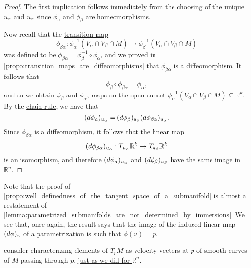 \documentclass[notoc,notitlepage]{tufte-book}
\begin{document}
\begin{proof}
  The first implication follows immediately from the choosing of the unique
  $u_\alpha$ and $u_\alpha$ since $\phi_\alpha$ and $\phi_\beta$ are
  homeomorphisms.

  Now recall that the \hyperref[defn:transition_map]{transition map}
  \begin{equation*}
    \phi_{\beta \alpha} : \phi_{\alpha}^{-1} (V_\alpha \cap V_\beta \cap M) \to
    \phi_{\beta}^{-1} (V_\alpha \cap V_\beta \cap M)
  \end{equation*}
  was defined to be $\phi_{\beta \alpha} = \phi_{\beta}^{-1} \circ
  \phi_{\alpha}$, and we proved in
  \cref{propo:transition_maps_are_diffeomorphisms} that $\phi_{\beta \alpha}$ is
  a \hyperref[defn:diffeomorphism]{diffeomorphism}. It follows that
  \begin{equation*}
    \phi_{\beta} \circ \phi_{\beta \alpha} = \phi_{\alpha},
  \end{equation*}
  and so we obtain $\phi_\beta$ and $\phi_\alpha$, maps on the open subset
  $\phi_{\alpha}^{-1} (V_\alpha \cap V_\beta \cap M) \subseteq \mathbb{R}^k$. By
  the \hyperref[thm:the_chain_rule]{chain rule}, we have that
  \begin{equation*}
    (\mathop{}\!d{\phi_\alpha})_{u_\alpha} = (\mathop{}\!d{\phi_\beta})_{u_\beta}
    (\mathop{}\!d{\phi_{\beta \alpha}})_{u_\alpha}.
  \end{equation*}
  Since $\phi_{\beta \alpha}$ is a diffeomorphism, it follows that the linear map
  \begin{equation*}
    (\mathop{}\!d{\phi_{\beta \alpha}})_{u_\alpha} : T_{u_\alpha} \mathbb{R}^k \to
    T_{u_\beta} \mathbb{R}^k
  \end{equation*}
  is an isomorphism, and therefore $(\mathop{}\!d{\phi_{\alpha}})_{u_\alpha}$ and
  $(\mathop{}\!d{\phi_\beta})_{u_\beta}$ have the same image in $\mathbb{R}^n$.
\end{proof}

\begin{note}
  Note that the proof of
  \cref{propo:well_definedness_of_the_tangent_space_of_a_submanifold} is almost
  a restatement of
  \cref{lemma:parametrized_submanifolds_are_not_determined_by_immersions}. We
  see that, once again, the result says that the image of the induced linear map
  $(\mathop{}\!d{\phi})_u$ of a parametrization is  such that $\phi(u) = p$.
\end{note}

 consider characterizing elements of $T_p M$ as velocity
vectors at $p$ of smooth curves of $M$ passing through $p$,
\hyperref[sec:smooth_curves_in_r_n_and_tangent_vectors_continued]{just as we did
for $\mathbb{R}^n$}.
\end{document}

